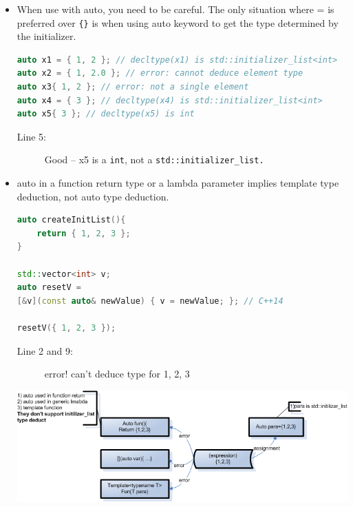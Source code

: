 \documentclass[a4paper,11pt,twoside]{book}
\begin{document}
\begin{itemize}
	\item When use with auto, you need to be careful. The only situation where = is preferred over \verb={}= is when using auto keyword to get the type determined by the initializer.
\begin{lstlisting}[frame=single, language=c++]
auto x1 = { 1, 2 }; // decltype(x1) is std::initializer_list<int>
auto x2 = { 1, 2.0 }; // error: cannot deduce element type
auto x3{ 1, 2 }; // error: not a single element
auto x4 = { 3 }; // decltype(x4) is std::initializer_list<int>
auto x5{ 3 }; // decltype(x5) is int
\end{lstlisting}
\begin{description}
	\item[Line 5:] Good -- x5 is a \texttt{int}, not a \texttt{std::initializer\_list.}
\end{description}

	\item auto in a function return type or a lambda parameter implies template type deduction, not auto type deduction.
\begin{lstlisting}[frame=single, language=c++]
auto createInitList(){
	return { 1, 2, 3 }; 
}
	
std::vector<int> v;
auto resetV =
[&v](const auto& newValue) { v = newValue; }; // C++14
	
resetV({ 1, 2, 3 }); 
\end{lstlisting}
\begin{description}
	\item[Line 2 and 9:] error! can't deduce type for { 1, 2, 3 }
\end{description}

	\begin{center}
        \includegraphics[scale=0.5]{pics/autotype.png}
    \end{center}


\end{itemize}
\end{document}
